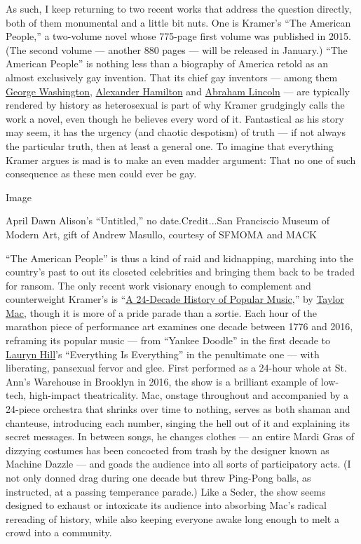 As such, I keep returning to two recent works that address the question
directly, both of them monumental and a little bit nuts. One is Kramer's
``The American People,'' a two-volume novel whose 775-page first volume
was published in 2015. (The second volume --- another 880 pages --- will
be released in January.) ``The American People'' is nothing less than a
biography of America retold as an almost exclusively gay invention. That
its chief gay inventors --- among them
\href{https://www.nytimes3xbfgragh.onion/topic/person/george-washington}{George
Washington},
\href{https://www.nytimes3xbfgragh.onion/topic/person/alexander-hamilton}{Alexander
Hamilton} and
\href{https://www.nytimes3xbfgragh.onion/topic/person/abraham-lincoln}{Abraham
Lincoln} --- are typically rendered by history as heterosexual is part
of why Kramer grudgingly calls the work a novel, even though he believes
every word of it. Fantastical as his story may seem, it has the urgency
(and chaotic despotism) of truth --- if not always the particular truth,
then at least a general one. To imagine that everything Kramer argues is
mad is to make an even madder argument: That no one of such consequence
as these men could ever be gay.

Image

April Dawn Alison's ``Untitled,'' no date.Credit...San Franciscio Museum
of Modern Art, gift of Andrew Masullo, courtesy of SFMOMA and MACK

``The American People'' is thus a kind of raid and kidnapping, marching
into the country's past to out its closeted celebrities and bringing
them back to be traded for ransom. The only recent work visionary enough
to complement and counterweight Kramer's is
``\href{https://www.nytimes3xbfgragh.onion/2016/09/18/theater/taylor-mac-24-decade-history-of-popular-music.html}{A
24-Decade History of Popular Music},'' by
\href{https://www.nytimes3xbfgragh.onion/2019/04/02/magazine/taylor-mac-gary-broadway.html}{Taylor
Mac}, though it is more of a pride parade than a sortie. Each hour of
the marathon piece of performance art examines one decade between 1776
and 2016, reframing its popular music --- from ``Yankee Doodle'' in the
first decade to
\href{https://www.nytimes3xbfgragh.onion/topic/person/lauryn-hill}{Lauryn
Hill}'s ``Everything Is Everything'' in the penultimate one --- with
liberating, pansexual fervor and glee. First performed as a 24-hour
whole at St. Ann's Warehouse in Brooklyn in 2016, the show is a
brilliant example of low-tech, high-impact theatricality. Mac, onstage
throughout and accompanied by a 24-piece orchestra that shrinks over
time to nothing, serves as both shaman and chanteuse, introducing each
number, singing the hell out of it and explaining its secret messages.
In between songs, he changes clothes --- an entire Mardi Gras of
dizzying costumes has been concocted from trash by the designer known as
Machine Dazzle --- and goads the audience into all sorts of
participatory acts. (I not only donned drag during one decade but threw
Ping-Pong balls, as instructed, at a passing temperance parade.) Like a
Seder, the show seems designed to exhaust or intoxicate its audience
into absorbing Mac's radical rereading of history, while also keeping
everyone awake long enough to melt a crowd into a community.

